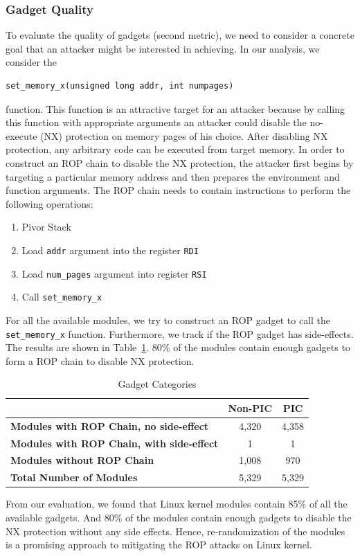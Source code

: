 \subsubsection*{Gadget Quality}
To evaluate the quality of gadgets (second metric), we need to consider a concrete goal that an attacker might be interested in achieving. In our analysis, we consider the
\begin{lstlisting}
set_memory_x(unsigned long addr, int numpages)
\end{lstlisting}
function. This function is an attractive target for an attacker because by calling this function with appropriate arguments an attacker could disable the no-execute (NX) protection on memory pages of his choice. After disabling NX protection, any arbitrary code can be executed from target memory. In order to construct an ROP chain to disable the NX protection, the attacker first begins by targeting a particular memory address and then prepares the environment and function arguments. The ROP chain needs to contain instructions to perform the following operations:
\begin{enumerate}[noitemsep]
    \item Pivor Stack
    \item Load \verb|addr| argument into the register \verb|RDI|
    \item Load \verb|num_pages| argument into register \verb|RSI|
    \item Call \verb|set_memory_x|
\end{enumerate}

For all the available modules, we try to construct an ROP gadget to call the \verb|set_memory_x| function. Furthermore, we track if the ROP gadget has side-effects. The results are shown in Table~\ref{tbl:gadget_quality}. 80\% of the modules contain enough gadgets to form a ROP chain to disable NX protection.

\begin{table}
    \caption{Gadget Categories}
    \begin{center}
    \begin{tabular}{lcc}
    \toprule
     & \textbf{Non-PIC} & \textbf{PIC} \\
    \midrule
    \textbf{Modules with ROP Chain, no side-effect} & 4,320 & 4,358 \\
    \textbf{Modules with ROP Chain, with side-effect} & 1 & 1 \\
    \textbf{Modules without ROP Chain} & 1,008 & 970 \\
    \hline
    \textbf{Total Number of Modules} & 5,329 & 5,329 \\
    \bottomrule
    \end{tabular}
    \end{center}
    \label{tbl:gadget_quality}
\end{table}

From our evaluation, we found that Linux kernel modules contain 85\% of all the available gadgets. And 80\% of the modules contain enough gadgets to disable the NX protection without any side effects. Hence, re-randomization of the modules is a promising approach to mitigating the ROP attacks on Linux kernel.